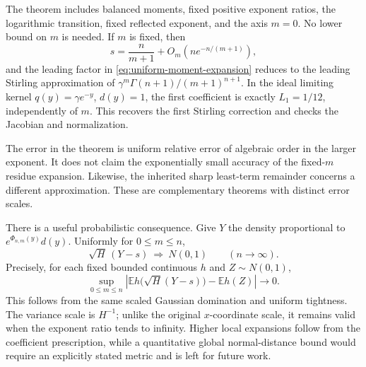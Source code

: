 The theorem includes balanced moments, fixed positive exponent ratios,
the logarithmic transition, fixed reflected exponent, and the axis $m=0$.
No lower bound on $m$ is needed. If $m$ is fixed, then
\[
 s=\frac{n}{m+1}+O_m(ne^{-n/(m+1)}),
\]
and the leading factor in \eqref{eq:uniform-moment-expansion} reduces to
the leading Stirling approximation of
$\gamma^m\Gamma(n+1)/(m+1)^{n+1}$. In the ideal limiting kernel
$q(y)=\gamma e^{-y}$, $d(y)=1$, the first coefficient is exactly
$L_1=1/12$, independently of $m$. This recovers the first Stirling
correction and checks the Jacobian and normalization.

The error in the theorem is uniform relative error of algebraic order
in the larger exponent. It does not claim the exponentially small
accuracy of the fixed-$m$ residue expansion. Likewise, the inherited
sharp least-term remainder concerns a different approximation. These
are complementary theorems with distinct error scales.

There is a useful probabilistic consequence. Give $Y$ the density
proportional to $e^{\Phi_{n,m}(y)}d(y)$. Uniformly for $0\le m\le n$,
\[
 \sqrt H\,(Y-s)\ \Longrightarrow\ N(0,1)
 \qquad(n\to\infty).
\]
Precisely, for each fixed bounded continuous $h$ and $Z\sim N(0,1)$,
\[
 \sup_{0\le m\le n}
 \left|\mathbb E h\bigl(\sqrt H(Y-s)\bigr)-\mathbb E h(Z)\right|
 \longrightarrow0.
\]
This follows from the same scaled Gaussian domination and uniform
tightness. The variance scale is $H^{-1}$;
unlike the original $x$-coordinate scale, it remains valid when the
exponent ratio tends to infinity. Higher local expansions follow from
the coefficient prescription, while a quantitative global normal-distance
bound would require an explicitly stated metric and is left for future work.
